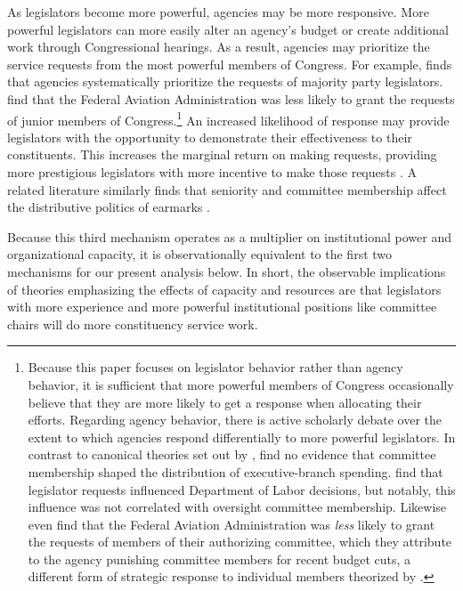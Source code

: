 \documentclass[12pt]{article}
\begin{document}
As legislators become more powerful, agencies may be more responsive. More powerful legislators can more easily alter an agency's budget or create additional work through Congressional hearings. As a result, agencies may prioritize the service requests from the most powerful members of Congress. %
For example, \citet{Lowande2018JOP} finds that agencies systematically prioritize the requests of majority party legislators.  \citet{MillsKalafHuges2015}  find that the Federal Aviation Administration was less likely to grant the requests of junior members of Congress.\footnote{Because this paper focuses on legislator behavior rather than agency behavior, it is sufficient that more powerful members of Congress occasionally believe that they are more likely to get a response when allocating their efforts. Regarding agency behavior, there is active scholarly debate over the extent to which agencies respond differentially to more powerful legislators. In contrast to canonical theories set out by  \citet{Arnold1979},  \citet{BerryBurdenHowell09} find no evidence that committee membership shaped the distribution of executive-branch spending. \citet{RitchieYou2018} find that legislator requests influenced Department of Labor decisions, but notably, this influence was not correlated with oversight committee membership. Likewise   \citet{MillsKalafHuges2015} even find that the Federal Aviation Administration was \emph{less} likely to grant the requests of members of their authorizing committee, which they attribute to the agency punishing committee members for recent budget cuts, a different form of strategic response to individual members theorized by \citet{Arnold1979}.}
An increased likelihood of response may provide legislators with the opportunity to demonstrate their effectiveness to their constituents. This increases the marginal return on making requests, providing more prestigious legislators with more incentive to make those requests \citep{CainFerejohnFiorina1987}.
A related literature similarly finds that seniority and committee membership affect the distributive politics of earmarks \citep{Lazarus2010}.

Because this third mechanism operates as a multiplier on institutional power and organizational capacity, it is observationally equivalent to the first two mechanisms for our present analysis below.
In short, the observable implications of theories emphasizing the effects of capacity and resources are that legislators with more experience and more powerful institutional positions like committee chairs will do more constituency service work.
\end{document}
